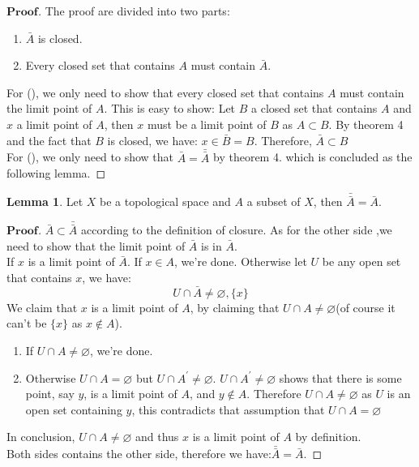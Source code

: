 \documentclass[a4paper, 11pt]{article}
\theoremstyle{remark}
\newenvironment{myprf}
{\renewcommand\qedsymbol{$ $}\begin{proof}[$\mathbf{Proof}$]}
  {\end{proof}}
\theoremstyle{definition}
\newtheorem{lemma}[theorem]{Lemma}
\begin{document}
\begin{myprf}
        The proof are divided into two parts:
        \begin{enumerate}[label=(\roman*)]
                \item $\bar{A}$ is closed.
                \item Every closed set that contains $A$ must contain $\bar{A}$.
        \end{enumerate}
        For (), we only need to show that every closed set that
        contains $A$ must contain the limit point of $A$. This is easy to show:
        Let $B$ a closed set that contains $A$ and $x$ a limit point of $A$, then
        $x$ must be a limit point of $B$ as $A\subset B$. By theorem 4 and 
        the fact that $B$ is closed, we have: $x\in \bar{B}=B$. Therefore, 
        $\bar{A}\subset B$\\
        For (), we only need to show that $\bar{A}=\bar{\bar{A}}$ by
        theorem 4. which is concluded as the following lemma.
\end{myprf}
\begin{lemma}
        Let $X$ be a topological space and $A$ a subset of $X$, then 
        $\bar{\bar{A}}=\bar{A}$.
\end{lemma}
\begin{myprf}
        $\bar{A}\subset \bar{\bar{A}}$ according to the definition of closure.
        As for the other side ,we need to show that the limit point of $\bar{A}$
        is in $\bar{A}$.\\
        If $x$ is a limit point of $\bar{A}$. If $x\in A$, we're done. 
        Otherwise let $U$ be any open set that contains $x$, we have:
        $$
        U\cap \bar{A}\neq \varnothing, \{x\}
        $$ We claim that $x$ is a limit point of $A$, by claiming that
        $U\cap A\neq \varnothing$(of course it can't be $\{x\}$ as $x\notin A$).
        \begin{enumerate}[label=(\roman*)]
                \item If $U\cap A\neq \varnothing$, we're done.
                \item Otherwise $U\cap A=\varnothing$ but $U\cap A^{'}\neq 
                        \varnothing$. $U\cap A^{'}\neq \varnothing$ shows that
        there is some point, say $y$, is a limit point of $A$, and $y\notin A$. 
        Therefore $U\cap A\neq \varnothing$ as $U$ is an open set
       containing $y$, this contradicts that assumption that $U\cap A=\varnothing$
        \end{enumerate}
        In conclusion, $U\cap A\neq \varnothing$ and thus $x$ is a limit point 
        of $A$ by definition.\\

        \noindent
        Both sides contains the other side, therefore we have:$\bar{\bar{A}}=
        \bar{A}$.
\end{myprf}
\end{document}
